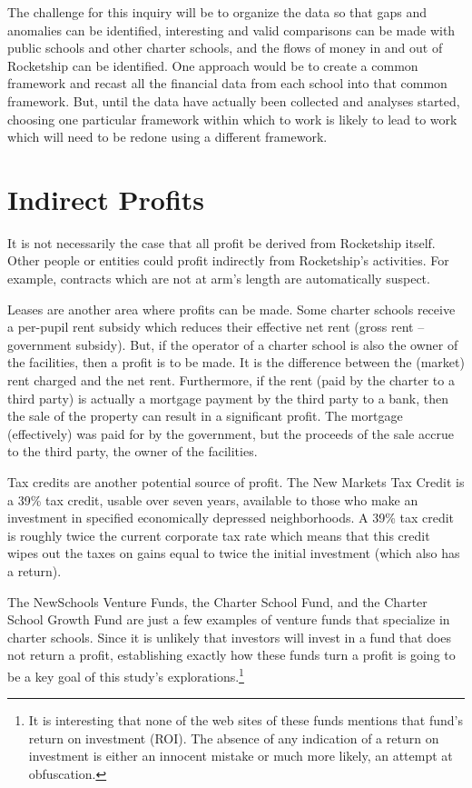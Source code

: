 The challenge for this inquiry will be to organize the data so that gaps and anomalies can be identified, interesting and valid comparisons can be made with public schools and other charter schools, and the flows of money in and out of Rocketship can be identified. One approach would be to create a common framework and recast all the financial data from each school into that common framework. But, until the data have actually been collected and analyses started, choosing one particular framework within which to work is likely to lead to work which will need to be redone using a different framework.

\section{Indirect Profits}\label{sec:indirect-profits}\indent

It is not necessarily the case that all profit be derived from Rocketship itself. Other people or entities could profit indirectly from Rocketship's activities. For example, contracts which are not at arm's length are automatically suspect.

Leases are another area where profits can be made. Some charter schools receive a per-pupil rent subsidy which reduces their effective net rent (gross rent – government subsidy). But, if the operator of a charter school is also the owner of the facilities, then a profit is to be made. It is the difference between the (market) rent charged and the net rent.  Furthermore, if the rent (paid by the charter to a third party) is actually a mortgage payment by the third party to a bank, then the sale of the property can result in a significant profit. The mortgage (effectively) was paid for by the government, but the proceeds of the sale accrue to the third party, the owner of the facilities.

Tax credits are another potential source of profit. The New Markets Tax Credit is a 39\% tax credit, usable over seven years, available to those who make an investment in specified economically depressed neighborhoods. A 39\% tax credit is roughly twice the current corporate tax rate which means that this credit wipes out the taxes on gains equal to twice the initial investment (which also has a return). 

The NewSchools Venture Funds, the Charter School Fund, and the Charter School Growth Fund are just a few examples of venture funds that specialize in charter schools. Since it is unlikely that investors will invest in a fund that does not return a profit, establishing exactly how these funds turn a profit is going to be a key goal of this study's explorations.\footnote{It is interesting that none of the web sites of these funds mentions that fund's return on investment (ROI). The absence of any indication of a return on investment is either an innocent mistake or much more likely, an attempt at obfuscation.}

